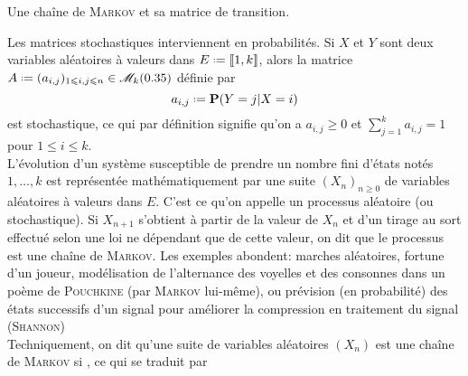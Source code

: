 
\begin{marginfigure}[3.5cm]
    \centering
    
    \caption*{\centering Une chaîne de \textsc{Markov} et sa matrice de transition.}
\end{marginfigure}

Les matrices stochastiques 
interviennent en probabilités. Si $X$ et $Y$ sont deux variables aléatoires à valeurs dans $E \defeq \llbracket 1, k \rrbracket$, alors la matrice $A \defeq (a_{i,j})_{1 \leqslant i,j \leqslant n} \in \M_k(\R)$ définie par 
$$a_{i,j} \defeq \P(Y = j | X = i)$$
est stochastique, ce qui par définition signifie qu'on a $a_{i,j} \geqslant 0$ et $\sum\limits_{j=1}^k a_{i,j} = 1$ pour $1 \leqslant i \leqslant k$. \\
L'évolution d'un système susceptible de prendre un nombre fini d'états notés $1, \dots, k$ est représentée mathématiquement par une suite $(X_n)_{n \geqslant 0}$ de variables aléatoires à valeurs dans $E$. C'est ce qu'on appelle un processus aléatoire (ou stochastique). Si $X_{n+1}$ s'obtient à partir de la valeur de $X_n$ et d'un tirage au sort effectué selon une loi ne dépendant que de cette valeur, on dit que le processus est une chaîne de \textsc{Markov}. Les exemples abondent: marches aléatoires, fortune d'un joueur, modélisation de l'alternance des voyelles et des consonnes dans un poème de \textsc{Pouchkine} (par \textsc{Markov} lui-même), ou prévision (en probabilité) des états  successifs d'un signal pour améliorer la compression en traitement du signal (\textsc{Shannon}) \\
Techniquement, on dit qu'une suite de variables aléatoires $(X_n)$ est une chaîne de \textsc{Markov} si , ce qui se traduit par
